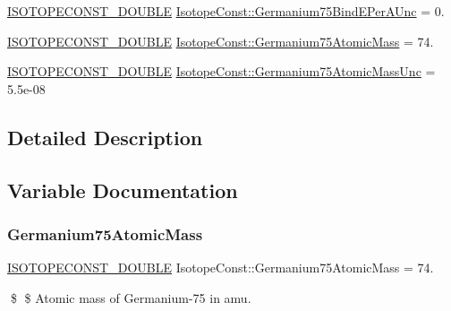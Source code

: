 \begin{DoxyCompactItemize}
\mbox{\hyperlink{group___isotope_const-_macros_ga8f45a7272ce02c0b4c65c44636ed719a}{I\+S\+O\+T\+O\+P\+E\+C\+O\+N\+S\+T\+\_\+\+D\+O\+U\+B\+LE}} \mbox{\hyperlink{group___isotope_const-_germanium-_ge75_ga6870b1cd9c4d2f1209b4e8f680486ae8}{Isotope\+Const\+::\+Germanium75\+Bind\+E\+Per\+A\+Unc}} = 0.
\item 
\mbox{\hyperlink{group___isotope_const-_macros_ga8f45a7272ce02c0b4c65c44636ed719a}{I\+S\+O\+T\+O\+P\+E\+C\+O\+N\+S\+T\+\_\+\+D\+O\+U\+B\+LE}} \mbox{\hyperlink{group___isotope_const-_germanium-_ge75_gaa18be60d4c7c116a000ba4625b2fdb35}{Isotope\+Const\+::\+Germanium75\+Atomic\+Mass}} = 74.
\item 
\mbox{\hyperlink{group___isotope_const-_macros_ga8f45a7272ce02c0b4c65c44636ed719a}{I\+S\+O\+T\+O\+P\+E\+C\+O\+N\+S\+T\+\_\+\+D\+O\+U\+B\+LE}} \mbox{\hyperlink{group___isotope_const-_germanium-_ge75_gac6b48cdcfc723fc40d438de94d8924d2}{Isotope\+Const\+::\+Germanium75\+Atomic\+Mass\+Unc}} = 5.\+5e-\/08
\end{DoxyCompactItemize}


\subsection{Detailed Description}


\subsection{Variable Documentation}
\mbox{\label{group___isotope_const-_germanium-_ge75_gaa18be60d4c7c116a000ba4625b2fdb35}} 
\subsubsection{\texorpdfstring{Germanium75\+Atomic\+Mass}{Germanium75AtomicMass}}
{\footnotesize\ttfamily \mbox{\hyperlink{group___isotope_const-_macros_ga8f45a7272ce02c0b4c65c44636ed719a}{I\+S\+O\+T\+O\+P\+E\+C\+O\+N\+S\+T\+\_\+\+D\+O\+U\+B\+LE}} Isotope\+Const\+::\+Germanium75\+Atomic\+Mass = 74.}

\$ \$ Atomic mass of Germanium-\/75 in amu. \mbox{\label{group___isotope_const-_germanium-_ge75_gac6b48cdcfc723fc40d438de94d8924d2}} 
